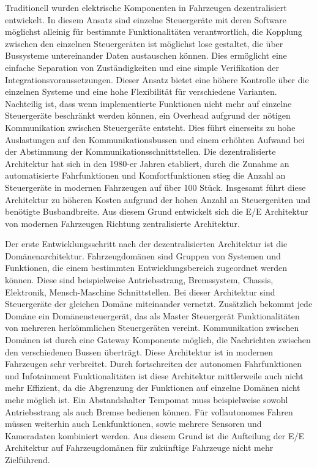 Traditionell wurden elektrische Komponenten in Fahrzeugen dezentralisiert entwickelt. In diesem Ansatz sind einzelne Steuergeräte mit deren Software möglichst alleinig für bestimmte Funktionalitäten verantwortlich, die Kopplung zwischen den einzelnen Steuergeräten ist möglichst lose gestaltet, die über Bussysteme untereinander Daten austauschen können. Dies ermöglicht eine einfache Separation von Zuständigkeiten und eine simple Verifikation der Integrationsvoraussetzungen. \cite{DiNatale2010} Dieser Ansatz bietet eine höhere Kontrolle über die einzelnen Systeme und eine hohe Flexibilität für verschiedene Varianten. Nachteilig ist, dass wenn implementierte Funktionen nicht mehr auf einzelne Steuergeräte beschränkt werden können, ein Overhead aufgrund der nötigen Kommunikation zwischen Steuergeräte entsteht. Dies führt einerseits zu hohe Auslastungen auf den Kommunikationsbussen und einem erhöhten Aufwand bei der Abstimmung der Kommunikationsschnittstellen. \cite{Reinhardt2013} Die dezentralisierte Architektur hat sich in den 1980-er Jahren etabliert, durch die Zunahme an automatisierte Fahrfunktionen und Komfortfunktionen stieg die Anzahl an Steuergeräte in modernen Fahrzeugen auf über 100 Stück. \cite{Amend2017} Insgesamt führt diese Architektur zu höheren Kosten aufgrund der hohen Anzahl an Steuergeräten und benötigte Busbandbreite. Aus diesem Grund entwickelt sich die E/E Architektur von modernen Fahrzeugen Richtung zentralisierte Architektur. 

Der erste Entwicklungsschritt nach der dezentralisierten Architektur ist die Domänenarchitektur. Fahrzeugdomänen sind Gruppen von Systemen und Funktionen, die einem bestimmten Entwicklungsbereich zugeordnet werden können. Diese sind beispielweise Antriebsstrang, Bremssystem, Chassis, Elektronik, Mensch-Maschine Schnittstellen. \cite{continental2024} Bei dieser Architektur sind Steuergeräte der gleichen Domäne miteinander vernetzt. Zusätzlich bekommt jede Domäne ein Domänensteuergerät, das als Master Steuergerät Funktionalitäten von mehreren herkömmlichen Steuergeräten vereint. Kommunikation zwischen Domänen ist durch eine Gateway Komponente möglich, die Nachrichten zwischen den verschiedenen Bussen überträgt. Diese Architektur ist in modernen Fahrzeugen sehr verbreitet. Durch fortschreiten der autonomen Fahrfunktionen und Infotainment Funktionalitäten ist diese Architektur mittlerweile auch nicht mehr Effizient, da die Abgrenzung der Funktionen auf einzelne Domänen nicht mehr möglich ist. Ein Abstandshalter Tempomat muss beispielweise sowohl Antriebsstrang als auch Bremse bedienen können. Für vollautonomes Fahren müssen weiterhin auch Lenkfunktionen, sowie mehrere Sensoren und Kameradaten kombiniert werden. Aus diesem Grund ist die Aufteilung der E/E Architektur auf Fahrzeugdomänen für zukünftige Fahrzeuge nicht mehr Zielführend. 


